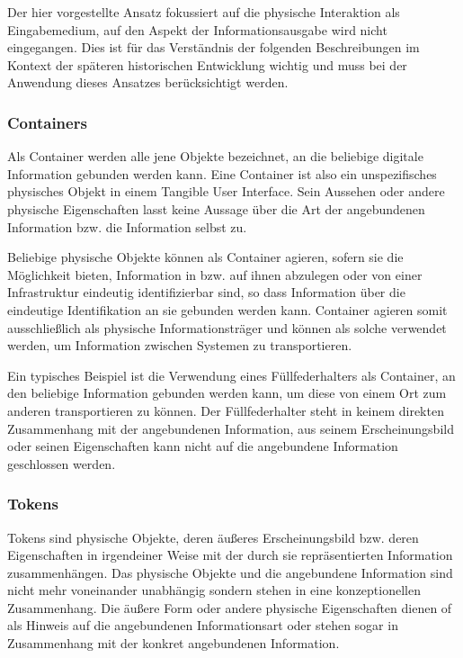 Der hier vorgestellte Ansatz fokussiert auf die physische Interaktion als Eingabemedium, auf den Aspekt der Informationsausgabe wird nicht eingegangen. Dies ist für das Verständnis der folgenden Beschreibungen im Kontext der späteren historischen Entwicklung wichtig und muss bei der Anwendung dieses Ansatzes berücksichtigt werden. 

\subsubsection{Containers}

Als Container werden alle jene Objekte bezeichnet, an die beliebige digitale Information gebunden werden kann. Eine Container ist also ein unspezifisches physisches Objekt in einem Tangible User Interface. Sein Aussehen oder andere physische Eigenschaften lasst keine Aussage über die Art der angebundenen Information bzw. die Information selbst zu. 

Beliebige physische Objekte können als Container agieren, sofern sie die Möglichkeit bieten, Information in bzw. auf ihnen abzulegen oder von einer Infrastruktur eindeutig identifizierbar sind, so dass Information über die eindeutige Identifikation an sie gebunden werden kann. Container agieren somit ausschließlich als physische Informationsträger und können als solche verwendet werden, um Information zwischen Systemen zu transportieren. 

Ein typisches Beispiel ist die Verwendung eines Füllfederhalters als Container, an den beliebige Information gebunden werden kann, um diese von einem Ort zum anderen transportieren zu können. Der Füllfederhalter steht in keinem direkten Zusammenhang mit der angebundenen Information, aus seinem Erscheinungsbild oder seinen Eigenschaften kann nicht auf die angebundene Information geschlossen werden.

\subsubsection{Tokens}

Tokens sind physische Objekte, deren äußeres Erscheinungsbild bzw. deren Eigenschaften in irgendeiner Weise mit der durch sie repräsentierten Information zusammenhängen. Das physische Objekte und die angebundene Information sind nicht mehr voneinander unabhängig sondern stehen in eine konzeptionellen Zusammenhang. Die äußere Form oder andere physische Eigenschaften dienen of als Hinweis auf die angebundenen Informationsart oder stehen sogar in Zusammenhang mit der konkret angebundenen Information.

